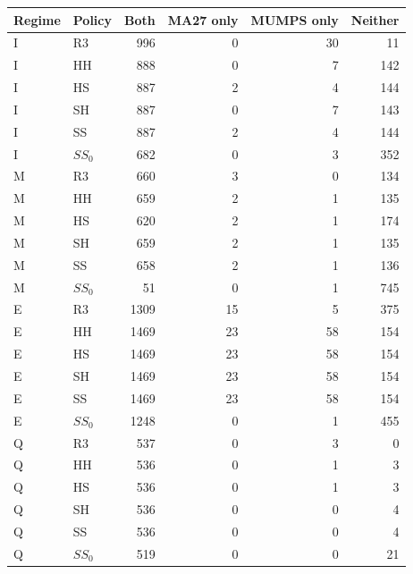 \begin{tabular}{@{}llrrrr@{}}
\toprule
Regime & Policy & Both & MA27 only & MUMPS only & Neither\\
\midrule
I & R3 & 996 & 0 & 30 & 11\\
I & HH & 888 & 0 & 7 & 142\\
I & HS & 887 & 2 & 4 & 144\\
I & SH & 887 & 0 & 7 & 143\\
I & SS & 887 & 2 & 4 & 144\\
I & $SS_0$ & 682 & 0 & 3 & 352\\
M & R3 & 660 & 3 & 0 & 134\\
M & HH & 659 & 2 & 1 & 135\\
M & HS & 620 & 2 & 1 & 174\\
M & SH & 659 & 2 & 1 & 135\\
M & SS & 658 & 2 & 1 & 136\\
M & $SS_0$ & 51 & 0 & 1 & 745\\
E & R3 & 1309 & 15 & 5 & 375\\
E & HH & 1469 & 23 & 58 & 154\\
E & HS & 1469 & 23 & 58 & 154\\
E & SH & 1469 & 23 & 58 & 154\\
E & SS & 1469 & 23 & 58 & 154\\
E & $SS_0$ & 1248 & 0 & 1 & 455\\
Q & R3 & 537 & 0 & 3 & 0\\
Q & HH & 536 & 0 & 1 & 3\\
Q & HS & 536 & 0 & 1 & 3\\
Q & SH & 536 & 0 & 0 & 4\\
Q & SS & 536 & 0 & 0 & 4\\
Q & $SS_0$ & 519 & 0 & 0 & 21\\
\bottomrule
\end{tabular}
